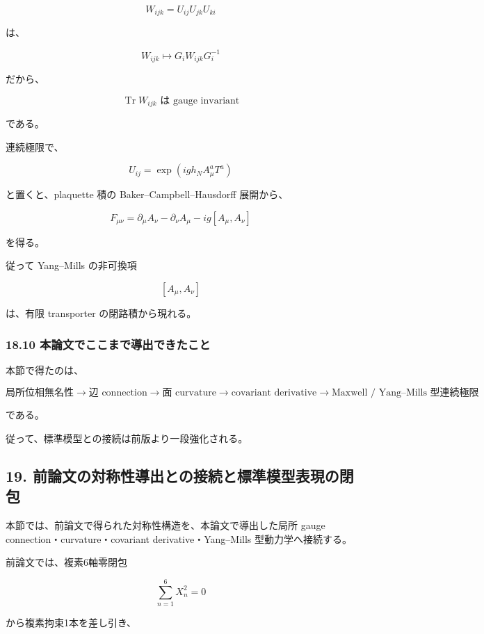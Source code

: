 \documentclass[
  a4paper,
]{ltjsarticle}
\begin{document}
\[
\boxed{
W_{ijk}
=
U_{ij}U_{jk}U_{ki}
}
\tag{91}
\]

は、

\[
W_{ijk}
\mapsto
G_iW_{ijk}G_i^{-1}
\]

だから、

\[
\boxed{
\operatorname{Tr}W_{ijk}
\text{ は gauge invariant}
}
\tag{92}
\]

である。

連続極限で、

\[
U_{ij}
=
\exp
\left(
igh_NA_\mu^aT^a
\right)
\]

と置くと、plaquette 積の Baker--Campbell--Hausdorff 展開から、

\[
\boxed{
F_{\mu\nu}
=
\partial_\mu A_\nu
-
\partial_\nu A_\mu
-
ig[A_\mu,A_\nu]
}
\tag{93}
\]

を得る。

従って Yang--Mills の非可換項

\[
[A_\mu,A_\nu]
\]

は、有限 transporter の閉路積から現れる。

\subsubsection{18.10
本論文でここまで導出できたこと}\label{ux672cux8ad6ux6587ux3067ux3053ux3053ux307eux3067ux5c0eux51faux3067ux304dux305fux3053ux3068}

本節で得たのは、

\[
\boxed{
\text{局所位相無名性}
\to
\text{辺 connection}
\to
\text{面 curvature}
\to
\text{covariant derivative}
\to
\text{Maxwell / Yang--Mills 型連続極限}
}
\tag{94}
\]

である。

従って、標準模型との接続は前版より一段強化される。

\subsection{19.
前論文の対称性導出との接続と標準模型表現の閉包}\label{ux524dux8ad6ux6587ux306eux5bfeux79f0ux6027ux5c0eux51faux3068ux306eux63a5ux7d9aux3068ux6a19ux6e96ux6a21ux578bux8868ux73feux306eux9589ux5305}

本節では、前論文で得られた対称性構造を、本論文で導出した局所 gauge
connection・curvature・covariant derivative・Yang--Mills
型動力学へ接続する。

前論文では、複素6軸零閉包

\[
\sum_{n=1}^{6}X_n^2=0
\]

から複素拘束1本を差し引き、
\end{document}
